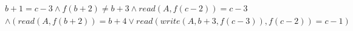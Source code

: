 \begin{align*}
%
& %
b + 1 = c - 3
%
\land
%
f(b + 2)  \neq  b + 3
%
\land
%
\mathit{read}(A,f(c - 2)) = c - 3
~\\~
& %
%
\land
%
(\mathit{read}(A,f(b + 2)) = b + 4 \lor \mathit{read}(\mathit{write}(A,b + 3,f(c - 3)),f(c - 2)) = c - 1)
%
\end{align*}
